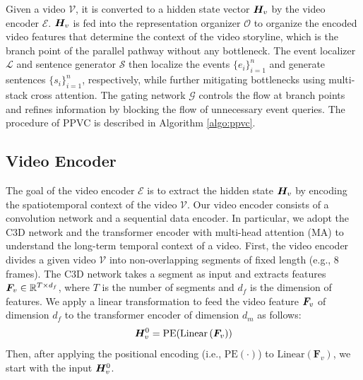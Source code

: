 Given a video $\mathcal{V}$, it is converted to a hidden state vector $\bm{H}_v$ by the video encoder $\mathcal{E}$.
$\bm{H}_v$ is fed into the representation organizer $\mathcal{O}$ to organize the encoded video features that determine the context of the video storyline, which is the branch point of the parallel pathway without any bottleneck.
The event localizer $\mathcal{L}$ and sentence generator $\mathcal{S}$ then localize the events $\{e_i\}_{i=1}^{n}$ and generate sentences $\{s_i\}_{i=1}^{n}$, respectively, while further mitigating bottlenecks using multi-stack cross attention.
The gating network $\mathcal{G}$ controls the flow at branch points and refines information by blocking the flow of unnecessary event queries.
The procedure of PPVC is described in Algorithm \ref{algo:ppvc}.

\subsection{Video Encoder}

The goal of the video encoder $\mathcal{E}$ is to extract the hidden state $\bm{H}_v$ by encoding the spatiotemporal context of the video $\mathcal{V}$.
Our video encoder consists of a convolution network and a sequential data encoder.
In particular, we adopt the C3D \cite{tran2015learning} network and the transformer encoder \cite{vaswani2017attention} with multi-head attention (MA) to understand the long-term temporal context of a video.
First, the video encoder divides a given video $\mathcal{V}$ into non-overlapping segments of fixed length (e.g., 8 frames).
The C3D network takes a segment as input and extracts features $\bm{F}_v \in \mathbb{R}^{T \times d_f}$, where $T$ is the number of segments and $d_f$ is the dimension of features.
We apply a linear transformation to feed the video feature $\bm{F}_v$ of dimension $d_f$ to the transformer encoder \cite{vaswani2017attention} of dimension $d_m$ as follows:
\begin{equation}
  \bm{H}_v^0 = \text{PE} (\text{Linear} \left( \bm{F}_v \right) )
  \label{eq:linear_transformation}
\end{equation}
Then, after applying the positional encoding (i.e., $\text{PE}(\cdot)$) to $\text{Linear}(\bm{F}_v)$, we start with the input $\bm{H}_v^0$.

